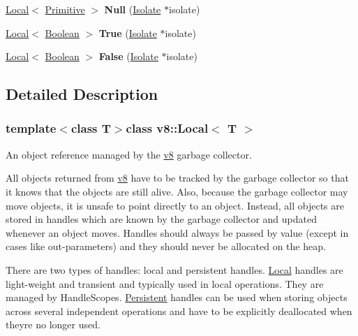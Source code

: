 \begin{DoxyCompactItemize}
\item 
\hypertarget{classv8_1_1_local_a6a29184b023bde58d4af2bba2d249a35}{}\hyperlink{classv8_1_1_local}{Local}$<$ \hyperlink{classv8_1_1_primitive}{Primitive} $>$ {\bfseries Null} (\hyperlink{classv8_1_1_isolate}{Isolate} $\ast$isolate)\label{classv8_1_1_local_a6a29184b023bde58d4af2bba2d249a35}

\item 
\hypertarget{classv8_1_1_local_aa5944f05409b5572b14793eff33a7908}{}\hyperlink{classv8_1_1_local}{Local}$<$ \hyperlink{classv8_1_1_boolean}{Boolean} $>$ {\bfseries True} (\hyperlink{classv8_1_1_isolate}{Isolate} $\ast$isolate)\label{classv8_1_1_local_aa5944f05409b5572b14793eff33a7908}

\item 
\hypertarget{classv8_1_1_local_ae8e414a3a8b3e1f2fa60c24e4dda0c4a}{}\hyperlink{classv8_1_1_local}{Local}$<$ \hyperlink{classv8_1_1_boolean}{Boolean} $>$ {\bfseries False} (\hyperlink{classv8_1_1_isolate}{Isolate} $\ast$isolate)\label{classv8_1_1_local_ae8e414a3a8b3e1f2fa60c24e4dda0c4a}

\end{DoxyCompactItemize}


\subsection{Detailed Description}
\subsubsection*{template$<$class T$>$class v8\+::\+Local$<$ T $>$}

An object reference managed by the \hyperlink{namespacev8}{v8} garbage collector.

All objects returned from \hyperlink{namespacev8}{v8} have to be tracked by the garbage collector so that it knows that the objects are still alive. Also, because the garbage collector may move objects, it is unsafe to point directly to an object. Instead, all objects are stored in handles which are known by the garbage collector and updated whenever an object moves. Handles should always be passed by value (except in cases like out-\/parameters) and they should never be allocated on the heap.

There are two types of handles\+: local and persistent handles. \hyperlink{classv8_1_1_local}{Local} handles are light-\/weight and transient and typically used in local operations. They are managed by Handle\+Scopes. \hyperlink{classv8_1_1_persistent}{Persistent} handles can be used when storing objects across several independent operations and have to be explicitly deallocated when they\textquotesingle{}re no longer used.

